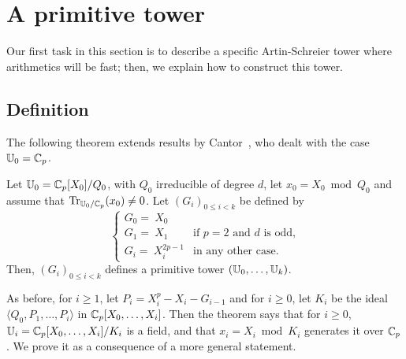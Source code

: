 \section{A primitive tower}
\label{sec:fast-tower}

Our first task in this section is to describe a specific
Artin-Schreier tower where arithmetics will be fast; then, we explain
how to construct this tower. 


\subsection{Definition}

The following theorem extends results by Cantor~\cite[Th.~1.2]{Can89},
who dealt with the case $\mathbb{U}_0=\mathbb{C}_p$.

\begin{theorem}
  \label{th:cantor}
  Let $\mathbb{U}_0=\mathbb{C}_p[X_0]/Q_0$, with $Q_0$ irreducible of
  degree $d$, let $x_0 = X_0 \bmod Q_0$ and assume that
  $\operatorname{Tr}_{\mathbb{U}_0/\mathbb{C}_p}(x_0)\ne0$. Let $(G_i)_{0 \le i <k}$ be defined by
$$ \begin{cases}
G_0 = ~X_0\\
G_1 = ~X_1        &\text{if $p=2$ and $d$ is odd,}\\
G_i = ~X_i^{2p-1} &\text{in any other case.}
\end{cases}$$
Then, $(G_i)_{0 \le i <k}$ defines a primitive tower $(\mathbb{U}_0,\dots,\mathbb{U}_k)$.
\end{theorem}
As before, for $i \ge 1$, let $P_i = X_i^p - X_i - G_{i-1}$ and for $i
\ge 0$, let $K_i$ be the ideal $\langle Q_0,P_1,\dots,P_i\rangle$ in
$\mathbb{C}_p[X_0,\dots,X_i]$.  Then the theorem says that for $i\ge 0$,
$\mathbb{U}_i=\mathbb{C}_p[X_0,\dots,X_i]/K_i$ is a field, and that $x_i=X_i \bmod
K_i$ generates it over $\mathbb{C}_p$.  We prove it as a consequence of a more
general statement.

